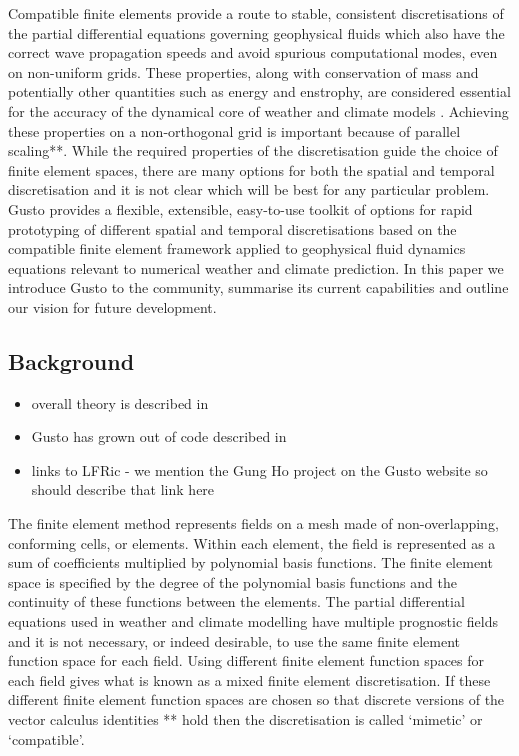 \documentclass[journal abbreviation, manuscript]{copernicus}
\begin{document}
Compatible finite elements provide a route to stable, consistent
discretisations of the partial differential equations governing
geophysical fluids which also have the correct wave propagation speeds
and avoid spurious computational modes, even on non-uniform
grids. These properties, along with conservation of mass and
potentially other quantities such as energy and enstrophy, are
considered essential for the accuracy of the dynamical core of weather
and climate models \citep{staniforth2012horizontal}. Achieving these
properties on a non-orthogonal grid is important because of parallel
scaling**. While the required properties of the discretisation guide the
choice of finite element spaces, there are many options for both the
spatial and temporal discretisation and it is not clear which will be
best for any particular problem. Gusto provides a flexible,
extensible, easy-to-use toolkit of options for rapid prototyping of
different spatial and temporal discretisations based on the compatible
finite element framework applied to geophysical fluid dynamics
equations relevant to numerical weather and climate prediction. In
this paper we introduce Gusto to the community, summarise its current
capabilities and outline our vision for future development.

\subsection{Background}

\begin{itemize}
\item overall theory is described in \citet{gibson2019compatible, cotter2023compatible}
\item Gusto has grown out of code described in \citet{natale2016compatible, cotter2012mixed, bendall2019recovered, bendall2020compatible, yamazaki2017vertical, shipton2018higher}
\item links to LFRic - we mention the Gung Ho project on the Gusto website so should describe that link here
\end{itemize}

The finite element method represents fields on a mesh made of
non-overlapping, conforming cells, or elements. Within each element,
the field is represented as a sum of coefficients multiplied by
polynomial basis functions. The finite element space is specified by
the degree of the polynomial basis functions and the continuity of
these functions between the elements. The partial differential
equations used in weather and climate modelling have multiple
prognostic fields and it is not necessary, or indeed desirable, to use
the same finite element function space for each field. Using different
finite element function spaces for each field gives what is known as a
mixed finite element discretisation. If these different finite element
function spaces are chosen so that discrete versions of the vector
calculus identities ** hold then the discretisation is called
`mimetic' or `compatible'.
\end{document}
